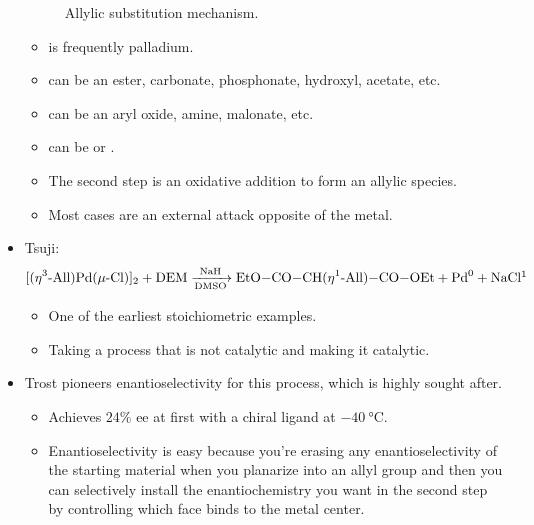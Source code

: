 \documentclass[../notes.tex]{subfiles}
\begin{document}
\begin{itemize}
\begin{figure}[h!]
        \vspace{4em}
        \caption{Allylic substitution mechanism.}
        \label{fig:mechanism-allylicSubstitution}
    \end{figure}
    \begin{itemize}
        \item {} is frequently palladium.
        \item {} can be an ester, carbonate, phosphonate, hydroxyl, acetate, etc.
        \item {} can be an aryl oxide, amine, malonate, etc.
        \item {} can be  or .
        \item The second step is an oxidative addition to form an allylic species.
        \item Most cases are an external attack opposite of the metal.
    \end{itemize}
    \item Tsuji:
    \begin{equation*}
        \ce{[(\eta^3{-}All)Pd(\mu{-}Cl)]2 + DEM ->[NaH][DMSO] EtO-CO-CH(\eta^1{-}All)-CO-OEt + Pd^0 + NaCl}\footnotemark
    \end{equation*}
    \begin{itemize}
        \item One of the earliest stoichiometric examples.
        \item Taking a process that is not catalytic and making it catalytic.
    \end{itemize}
    \item Trost pioneers enantioselectivity for this process, which is highly sought after.
    \begin{itemize}
        \item Achieves $24\%$ ee at first with a chiral ligand at $\SI{-40}{\celsius}$.
        \item Enantioselectivity is easy because you're erasing any enantioselectivity of the starting material when you planarize into an allyl group and then you can selectively install the enantiochemistry you want in the second step by controlling which face binds to the metal center.

\end{itemize}
\end{itemize}
\end{document}
